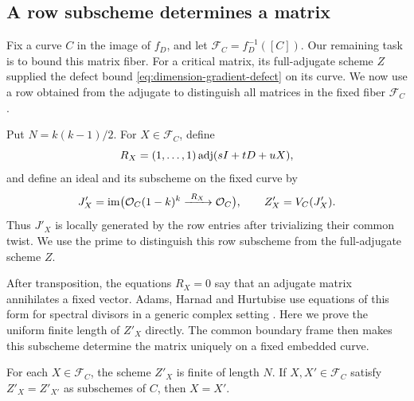 \subsection{A row subscheme determines a matrix}

Fix a curve $C$ in the image of $f_D$, and let
$\mathcal F_C=f_D^{-1}([C])$.  Our remaining task is to bound this
matrix fiber.  For a critical matrix, its full-adjugate scheme $Z$
supplied the defect bound \eqref{eq:dimension-gradient-defect} on its
curve.  We now use a row obtained from the adjugate to distinguish all
matrices in the fixed fiber $\mathcal F_C$.

Put $N=k(k-1)/2$.  For $X\in\mathcal F_C$, define
\[
 R_X=(1,\ldots,1)\operatorname{adj}(sI+tD+uX),
\]
and define an ideal and its subscheme on the fixed curve by
\begin{equation}
 \label{eq:row-adjugate-ideal}
 J'_X=\operatorname{im}\bigl(
 \mathcal O_C(1-k)^k\xrightarrow{\ R_X\ }\mathcal O_C\bigr),
 \qquad Z'_X=V_C(J'_X).
\end{equation}
Thus $J'_X$ is locally generated by the row entries after trivializing
their common twist.  We use the prime to distinguish this row subscheme
from the full-adjugate scheme $Z$.

After transposition, the equations $R_X=0$ say that an adjugate matrix
annihilates a fixed vector.  Adams, Harnad and Hurtubise use equations
of this form for spectral divisors in a generic complex setting
\cite[Section~1b, equation~(1.29) in arXiv:hep-th/9210089v1]{AdamsHarnadHurtubise1993}.
Here we prove the uniform finite length of $Z'_X$ directly.  The common
boundary frame then makes this subscheme determine the matrix uniquely
on a fixed embedded curve.

\begin{lemma}
For each $X\in\mathcal F_C$\label{lem:row-adjugate-scheme}, the scheme $Z'_X$ is finite of length $N$.
If $X,X'\in\mathcal F_C$ satisfy $Z'_X=Z'_{X'}$ as subschemes of $C$,
then $X=X'$.
\end{lemma}

